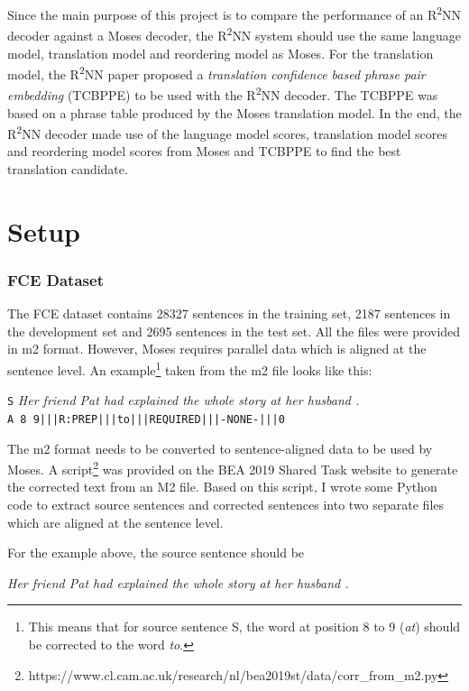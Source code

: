\documentclass[12pt,a4paper,twoside,openright]{report}
\begin{document}
Since the main purpose of this project is to compare the performance of an R\textsuperscript{2}NN decoder against a Moses decoder, the R\textsuperscript{2}NN system should use the same language model, translation model and reordering model as Moses. For the translation model, the R\textsuperscript{2}NN paper\cite{r2nn} proposed a \textit{translation confidence based phrase pair embedding} (TCBPPE) to be used with the R\textsuperscript{2}NN decoder. The TCBPPE was based on a phrase table produced by the Moses translation model. In the end, the R\textsuperscript{2}NN decoder made use of the language model scores, translation model scores and reordering model scores from Moses and TCBPPE to find the best translation candidate.

\section{Setup}\label{section:setup}

\subsubsection{FCE Dataset}

The FCE dataset contains 28327 sentences in the training set, 2187 sentences in the development set and 2695 sentences in the test set. All the files were provided in m2 format. However, Moses requires parallel data which is aligned at the sentence level. An example\footnote{This means that for source sentence S, the word at position 8 to 9 (\textit{at}) should be corrected to the word \textit{to}.} taken from the m2 file looks like this:

\texttt{S} \textit{Her friend Pat had explained the whole story at her husband .}\\
\texttt{A 8 9|||R:PREP|||to|||REQUIRED|||-NONE-|||0}

The m2 format needs to be converted to sentence-aligned data to be used by Moses. A script\footnote{https://www.cl.cam.ac.uk/research/nl/bea2019st/data/corr\_from\_m2.py} was provided on the BEA 2019 Shared Task website to generate the corrected text from an M2 file. Based on this script, I wrote some Python code to extract source sentences and corrected sentences into two separate files which are aligned at the sentence level.

For the example above, the source sentence should be

\textit{Her friend Pat had explained the whole story at her husband .}
\end{document}
